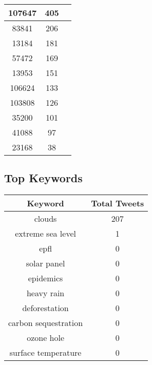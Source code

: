 \documentclass{article}\usepackage[T1]{fontenc}
\begin{document}
\begin{tabular}{|c|c|c|}
 \hline
107647 & 405\\ 
 \hline
83841 & 206\\ 
 \hline
13184 & 181\\ 
 \hline
57472 & 169\\ 
 \hline
13953 & 151\\ 
 \hline
106624 & 133\\ 
 \hline
103808 & 126\\ 
 \hline
35200 & 101\\ 
 \hline
41088 & 97\\ 
 \hline
23168 & 38\\ 
 \hline
\end{tabular}\subsection*{Top Keywords}\begin{tabular}{|c|c|}         \hline         Keyword & Total Tweets \\ 
 \hline
clouds & 207\\ 
 \hline
extreme sea level & 1\\ 
 \hline
epfl & 0\\ 
 \hline
solar panel & 0\\ 
 \hline
epidemics & 0\\ 
 \hline
heavy rain & 0\\ 
 \hline
deforestation & 0\\ 
 \hline
carbon sequestration & 0\\ 
 \hline
ozone hole & 0\\ 
 \hline
surface temperature & 0\\ 
 \hline
\end{tabular}
\end{document}
